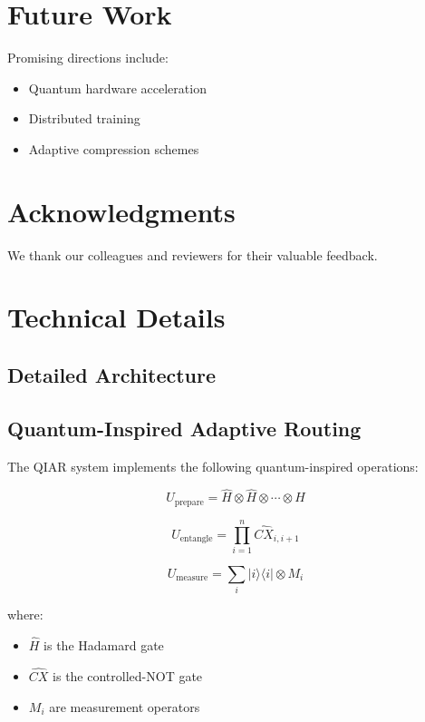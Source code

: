 \documentclass[10pt,twocolumn]{article}
\begin{document}
\section{Future Work}
Promising directions include:
\begin{itemize}
    \item Quantum hardware acceleration
    \item Distributed training
    \item Adaptive compression schemes
\end{itemize}

\section*{Acknowledgments}
We thank our colleagues and reviewers for their valuable feedback.

\appendix
\section{Technical Details}
\subsection{Detailed Architecture}

\subsection{Quantum-Inspired Adaptive Routing}

The QIAR system implements the following quantum-inspired operations:

\begin{equation}
    U_{\text{prepare}} = \hat{H} \otimes \hat{H} \otimes \cdots \otimes \hat{H}
\end{equation}

\begin{equation}
    U_{\text{entangle}} = \prod_{i=1}^n \hat{CX}_{i,i+1}
\end{equation}

\begin{equation}
    U_{\text{measure}} = \sum_i |i\rangle\langle i| \otimes M_i
\end{equation}

where:
\begin{itemize}
    \item $\hat{H}$ is the Hadamard gate
    \item $\hat{CX}$ is the controlled-NOT gate
    \item $M_i$ are measurement operators
\end{itemize}
\end{document}
